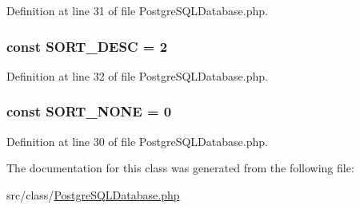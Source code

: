 Definition at line 31 of file Postgre\+S\+Q\+L\+Database.\+php.

\hypertarget{class_postgre_s_q_l_database_a0e633ab431ae1e5cc483a37cfe73bb09}{}
\subsubsection[{S\+O\+R\+T\+\_\+\+D\+E\+S\+C}]{\setlength{\rightskip}{0pt plus 5cm}const S\+O\+R\+T\+\_\+\+D\+E\+S\+C = 2}\label{class_postgre_s_q_l_database_a0e633ab431ae1e5cc483a37cfe73bb09}


Definition at line 32 of file Postgre\+S\+Q\+L\+Database.\+php.

\hypertarget{class_postgre_s_q_l_database_af3826c676cb54905f393f9d1f7ad48ea}{}
\subsubsection[{S\+O\+R\+T\+\_\+\+N\+O\+N\+E}]{\setlength{\rightskip}{0pt plus 5cm}const S\+O\+R\+T\+\_\+\+N\+O\+N\+E = 0}\label{class_postgre_s_q_l_database_af3826c676cb54905f393f9d1f7ad48ea}


Definition at line 30 of file Postgre\+S\+Q\+L\+Database.\+php.



The documentation for this class was generated from the following file\+:\begin{DoxyCompactItemize}
\item 
src/class/\hyperlink{_postgre_s_q_l_database_8php}{Postgre\+S\+Q\+L\+Database.\+php}\end{DoxyCompactItemize}
